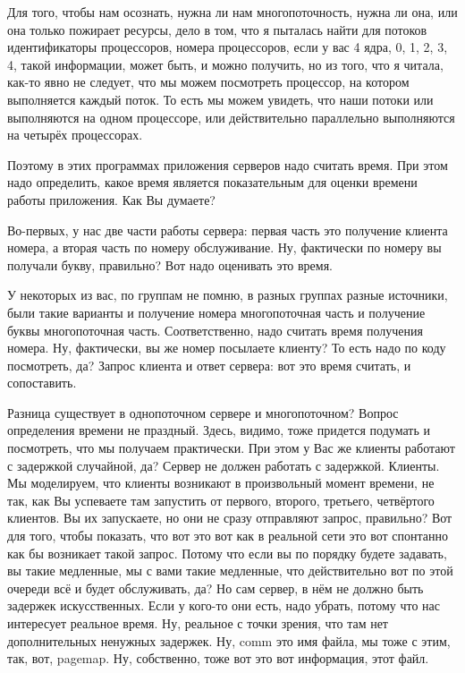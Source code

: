 \documentclass[12pt]{article} %
\begin{document}

Для того, чтобы нам осознать, нужна ли нам многопоточность, нужна ли она, или она только пожирает ресурсы,  дело в том, что я пыталась найти для потоков идентификаторы процессоров, номера процессоров, если у вас 4 ядра, 0, 1, 2, 3, 4, такой информации, может быть, и можно получить, но из того, что я читала, как-то явно не следует, что мы можем посмотреть процессор, на котором выполняется каждый поток.  То есть мы можем увидеть, что наши потоки или выполняются на одном процессоре, или действительно параллельно выполняются на четырёх процессорах.  

Поэтому в этих программах приложения серверов надо считать время. При этом надо определить, какое время является показательным для оценки времени работы приложения. Как Вы думаете?  

Во-первых, у нас две части работы сервера: первая часть это получение клиента номера, а вторая часть по номеру обслуживание.  Ну, фактически по номеру вы получали букву, правильно?  Вот надо оценивать это время.  

У некоторых из вас, по группам не помню, в разных группах разные источники, были такие варианты и получение номера многопоточная часть и получение буквы многопоточная часть.  Соответственно, надо считать время получения номера.  Ну, фактически, вы же номер посылаете клиенту?  То есть надо по коду посмотреть, да?  Запрос клиента и ответ сервера: вот это время считать, и сопоставить.

Разница существует в однопоточном сервере и многопоточном?  Вопрос  определения времени не праздный.  Здесь, видимо, тоже придется подумать и посмотреть, что мы получаем практически. При этом у Вас же клиенты работают с задержкой случайной, да?  Сервер не должен работать с задержкой.  Клиенты. Мы моделируем, что клиенты возникают в произвольный момент времени, не так, как Вы успеваете там запустить от первого, второго, третьего, четвёртого клиентов.  Вы их запускаете, но они не сразу отправляют запрос, правильно?  Вот для того, чтобы показать, что вот это вот как в реальной сети это вот спонтанно как бы возникает такой запрос.  Потому что если вы по порядку будете задавать, вы такие медленные, мы с вами такие медленные, что действительно вот по этой очереди всё и будет обслуживать, да?  Но сам сервер, в нём не должно быть задержек искусственных.  Если у кого-то они есть, надо убрать, потому что нас интересует реальное время.  Ну, реальное с точки зрения, что там нет дополнительных ненужных задержек.  Ну, comm это имя файла, мы тоже с этим, так, вот, pagemap.  Ну, собственно, тоже вот это вот информация, этот файл.
\end{document}
